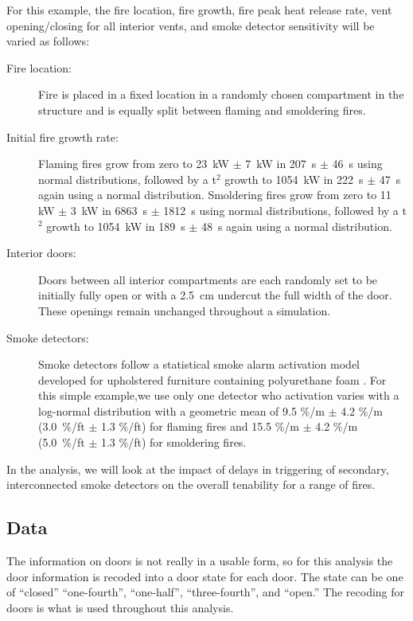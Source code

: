 \documentclass[12pt,twoside]{book}
\begin{document}
For this example, the fire location, fire growth, fire peak heat release rate, vent opening/closing for all interior vents, and smoke detector sensitivity will be varied as follows:

\begin{description}
\item[Fire location:] Fire is placed in a fixed location in a randomly chosen compartment in the structure and is equally split between flaming and smoldering fires.
\item[Initial fire growth rate:] Flaming fires grow from zero to 23~kW $\pm$ 7~kW in 207~s $\pm$ 46~s using normal distributions, followed by a t$^2$ growth to 1054~kW in 222~s $\pm$ 47~s again using a normal distribution. Smoldering fires grow from zero to 11~ kW $\pm$ 3~kW in 6863~s $\pm$ 1812~s using normal distributions, followed by a t$^2$ growth to 1054~kW in 189~s $\pm$ 48~s again using a normal distribution.
\item[Interior doors:] Doors between all interior compartments are each randomly set to be initially fully open or with a 2.5~cm undercut the full width of the door. These openings remain unchanged throughout a simulation.
\item[Smoke detectors:] Smoke detectors follow a statistical smoke alarm activation model developed for upholstered furniture containing polyurethane foam \cite{Cleary:2017}. For this simple example,we use only one detector who activation varies with a log-normal distribution with a geometric mean of 9.5 \%/m $\pm$ 4.2 \%/m (3.0~\%/ft $\pm$ 1.3 \%/ft) for flaming fires and 15.5 \%/m $\pm$ 4.2 \%/m (5.0~\%/ft $\pm$ 1.3 \%/ft) for smoldering fires.
\end{description}

In the analysis, we will look at the impact of delays in triggering of secondary, interconnected smoke detectors on the overall tenability for a range of fires.


\hypertarget{data}{%
\subsection{Data}\label{data}}

The information on doors is not really in a usable form, so for this analysis the door information is recoded into a door state for each door. The state can be one of ``closed'' ``one-fourth'', ``one-half'', ``three-fourth'', and ``open.'' The recoding for doors is what is used throughout this analysis.
\end{document}
